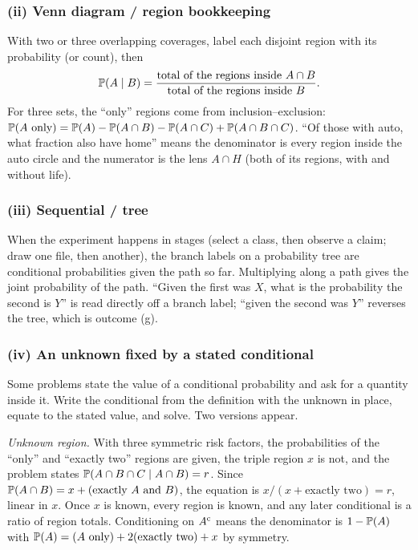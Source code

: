 \subsubsection*{(ii) Venn diagram / region bookkeeping}

With two or three overlapping coverages, label each disjoint region with its
probability (or count), then
\[
\mathbb{P}(A \mid B) = \frac{\text{total of the regions inside } A \cap B}{\text{total of the regions inside } B}.
\]
For three sets, the ``only'' regions come from inclusion--exclusion:
$\mathbb{P}(A \text{ only}) = \mathbb{P}(A) - \mathbb{P}(A\cap B) - \mathbb{P}(A \cap C) + \mathbb{P}(A \cap B \cap C)$.
``Of those with auto, what fraction also have home'' means the denominator is
every region inside the auto circle and the numerator is the lens $A \cap H$
(both of its regions, with and without life).

\subsubsection*{(iii) Sequential / tree}

When the experiment happens in stages (select a class, then observe a claim;
draw one file, then another), the branch labels on a probability tree are
conditional probabilities given the path so far. Multiplying along a path gives
the joint probability of the path. ``Given the first was $X$, what is the
probability the second is $Y$'' is read directly off a branch label; ``given the
second was $Y$'' reverses the tree, which is outcome (g).

\subsubsection*{(iv) An unknown fixed by a stated conditional}

Some problems state the value of a conditional probability and ask for a
quantity inside it. Write the conditional from the definition with the unknown
in place, equate to the stated value, and solve. Two versions appear.

\emph{Unknown region.} With three symmetric risk factors, the probabilities of
the ``only'' and ``exactly two'' regions are given, the triple region $x$ is
not, and the problem states $\mathbb{P}(A \cap B \cap C \mid A \cap B) = r$. Since
$\mathbb{P}(A \cap B) = x + (\text{exactly } A \text{ and } B)$, the equation is
$x/(x + \text{exactly two}) = r$, linear in $x$. Once $x$ is known, every region
is known, and any later conditional is a ratio of region totals. Conditioning on
$A^{\mathrm{c}}$ means the denominator is $1 - \mathbb{P}(A)$ with
$\mathbb{P}(A) = (A \text{ only}) + 2(\text{exactly two}) + x$ by symmetry.


